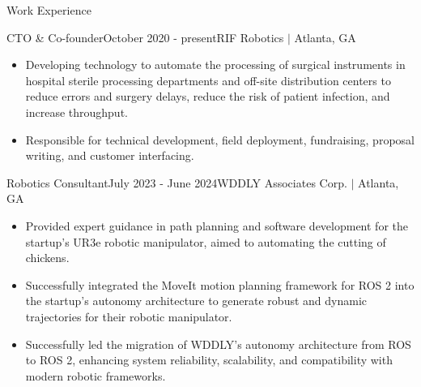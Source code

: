 \documentclass{resume} %
\newcommand{\sectionspace}{\vspace{3mm}}
\begin{document}
\sectionspace
\begin{rSection}{Work Experience}

\begin{rSubsection}{CTO \& Co-founder}{October 2020 - present}{RIF Robotics $\vert$ Atlanta, GA}{}

\item
  \begin{itemize}

  \item Developing technology to automate the processing of surgical instruments
    in hospital sterile processing departments and off-site distribution centers
    to reduce errors and surgery delays, reduce the risk of patient infection,
    and increase throughput.

  \item Responsible for technical development, field deployment, fundraising,
    proposal writing, and customer interfacing.


  \end{itemize}
\end{rSubsection}


\begin{rSubsection}{Robotics Consultant}{July 2023 - June 2024}{WDDLY Associates Corp. $\vert$ Atlanta, GA}{}

\item
\begin{itemize}
\item Provided expert guidance in path planning and software development for
  the startup's UR3e robotic manipulator, aimed to automating the cutting of
  chickens.

\item Successfully integrated the MoveIt motion planning framework for ROS 2
  into the startup's autonomy architecture to generate robust and dynamic
  trajectories for their robotic manipulator.

\item Successfully led the migration of WDDLY's autonomy architecture from ROS
  to ROS 2, enhancing system reliability, scalability, and compatibility with
  modern robotic frameworks.

\end{itemize}


\end{rSubsection}
\end{rSection}
\end{document}

